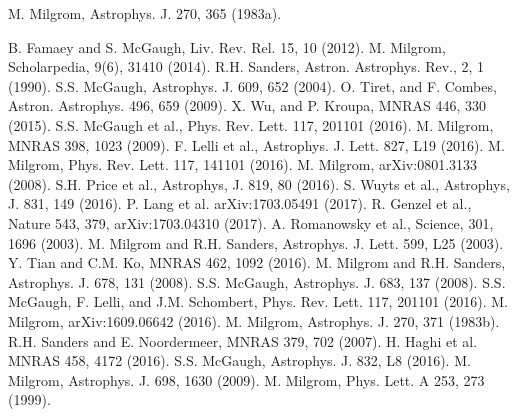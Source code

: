 \documentclass[twocolumn,showpacs,amsmath,amssymb,prd,nofootinbib]
{revtex4}
\begin{document}
\begin{thebibliography}{}
M. Milgrom, Astrophys. J. 270, 365 (1983a).

B. Famaey and S. McGaugh,  Liv. Rev. Rel. 15, 10 (2012).
M. Milgrom, Scholarpedia, 9(6), 31410 (2014).
R.H. Sanders, Astron. Astrophys. Rev., 2, 1 (1990).
S.S. McGaugh, Astrophys. J. 609, 652 (2004).
O. Tiret, and F. Combes, Astron. Astrophys. 496, 659 (2009).
X.  Wu, and P.  Kroupa, MNRAS 446, 330 (2015).
S.S. McGaugh et al., Phys. Rev. Lett. 117, 201101 (2016).
M. Milgrom, MNRAS 398, 1023 (2009).
F. Lelli et al., Astrophys. J. Lett. 827, L19 (2016).
M. Milgrom, Phys. Rev. Lett. 117, 141101 (2016).
M. Milgrom, arXiv:0801.3133 (2008).
S.H. Price et al., Astrophys, J. 819, 80 (2016).
S. Wuyts et al., Astrophys, J. 831, 149 (2016).
P. Lang et al.  arXiv:1703.05491 (2017).
R. Genzel et al., Nature 543, 379, arXiv:1703.04310 (2017).
\newpage
{}A. Romanowsky et al., Science, 301, 1696 (2003).
M. Milgrom and R.H. Sanders, Astrophys. J. Lett. 599, L25 (2003).
Y. Tian and C.M. Ko, MNRAS 462, 1092 (2016).
M. Milgrom and R.H. Sanders, Astrophys. J. 678, 131 (2008).
 S.S. McGaugh, Astrophys. J. 683, 137 (2008).
S.S. McGaugh, F. Lelli, and J.M. Schombert, Phys. Rev. Lett. 117, 201101 (2016).
M. Milgrom,    arXiv:1609.06642 (2016).
M. Milgrom, Astrophys. J. 270, 371 (1983b).
R.H. Sanders and E. Noordermeer, MNRAS 379, 702 (2007).
H. Haghi et al. MNRAS 458, 4172 (2016).
 S.S. McGaugh, Astrophys. J. 832, L8 (2016).
M. Milgrom, Astrophys. J. 698, 1630 (2009).
M. Milgrom, Phys. Lett. A 253, 273 (1999).
\end{thebibliography}
\clearpage
\end{document}
